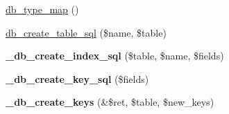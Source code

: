 \begin{Indent}{\bf }\par
\begin{CompactItemize}
\item 
\hyperlink{group__schemaapi_gadf0495656599ba9336d68675b54f8dd}{db\_\-type\_\-map} ()
\item 
\hyperlink{group__schemaapi_gd567c41b41c4d48ed50af9b878c8ecaf}{db\_\-create\_\-table\_\-sql} (\$name, \$table)
\item 
\hypertarget{group__schemaapi_g67b8a831a7fa968df49a645b11173e82}{
\textbf{\_\-db\_\-create\_\-index\_\-sql} (\$table, \$name, \$fields)}
\label{group__schemaapi_g67b8a831a7fa968df49a645b11173e82}

\item 
\hypertarget{group__schemaapi_gaaad5b3ac359e52b5c8e1058a3748615}{
\textbf{\_\-db\_\-create\_\-key\_\-sql} (\$fields)}
\label{group__schemaapi_gaaad5b3ac359e52b5c8e1058a3748615}

\item 
\hypertarget{group__schemaapi_g40102607d0c0d76f92fc9acd18bd9cc9}{
\textbf{\_\-db\_\-create\_\-keys} (\&\$ret, \$table, \$new\_\-keys)}
\label{group__schemaapi_g40102607d0c0d76f92fc9acd18bd9cc9}


\end{CompactItemize}
\end{Indent}
